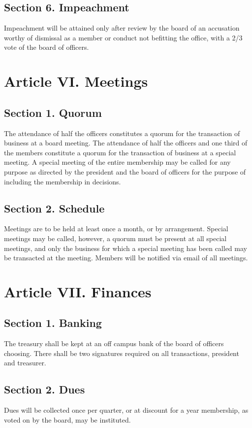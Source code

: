 \documentclass{article}
\begin{document}
  \subsection{Section 6. Impeachment}
    Impeachment will be attained only after review by the board of an accusation worthy of dismissal as a member or conduct not befitting the office, with a 2/3 vote of the board of officers.

\section{Article VI. Meetings}
  \subsection{Section 1. Quorum}
    The attendance of half the officers constitutes a quorum for the transaction of business at a board meeting. The attendance of half the officers and one third of the members constitute a quorum for the transaction of business at a special meeting. A special meeting of the entire membership may be called for any purpose as directed by the president and the board of officers for the purpose of including the membership in decisions.

  \subsection{Section 2. Schedule}
    Meetings are to be held at least once a month, or by arrangement. Special meetings may be called, however, a quorum must be present at all special meetings, and only the business for which a special meeting has been called may be transacted at the meeting. Members will be notified via email of all meetings.

\section{Article VII. Finances}
  \subsection{Section 1. Banking}
    The treasury shall be kept at an off campus bank of the board of officers choosing. There shall be two signatures required on all transactions, president and treasurer.

  \subsection{Section 2. Dues}
    Dues will be collected once per quarter, or at discount for a year membership, as voted on by the board, may be instituted.
\end{document}
